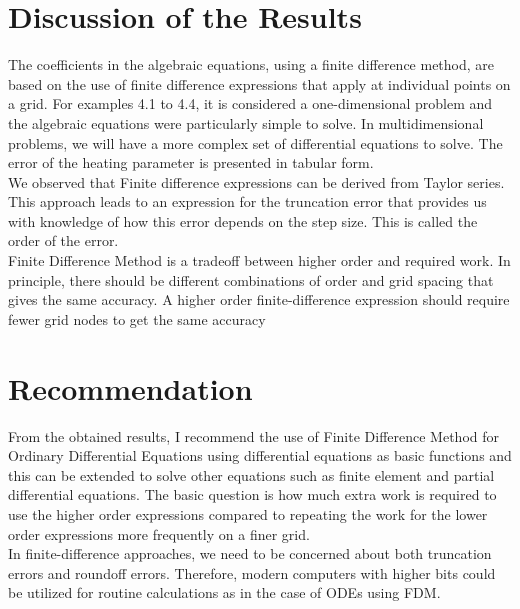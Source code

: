 \documentclass[12pt]{report}
\newcommand{\NI}{\noindent}
\begin{document}
	
	\section{Discussion of the Results}
	The coefficients in the algebraic equations, using a finite difference method, are based on the use of finite difference expressions that apply at individual points on a grid. For examples 4.1 to 4.4, it is considered a one-dimensional problem and the algebraic equations were particularly simple to solve. In multidimensional problems, we will have a more complex set of differential equations to solve. The error of the heating parameter is presented in tabular form.\\
	
	\NI We observed that Finite difference expressions can be derived from Taylor series. This approach leads to an expression for the truncation error that provides us with knowledge of how this error depends on the step size. This is called the order of the error.\\
	
	\NI Finite Difference Method is a tradeoff between higher order and required work. In principle, there should be different combinations of order and grid spacing that gives the same accuracy. A higher order finite-difference expression should require fewer grid nodes to get the same
	accuracy
	

	\section{Recommendation}
	From the obtained results, I recommend the use of Finite Difference Method for Ordinary Differential Equations using differential equations as basic functions and this can be extended to solve other equations such as finite element and partial differential equations. The basic question is how much extra work is required to use the higher order expressions compared to
	repeating the work for the lower order expressions more frequently on a finer grid.\\
	
	\NI In finite-difference approaches, we need to be concerned about both truncation errors and roundoff errors. Therefore, modern computers with higher bits could be utilized for routine calculations as in the case of ODEs using FDM.
	
	
\end{document}
